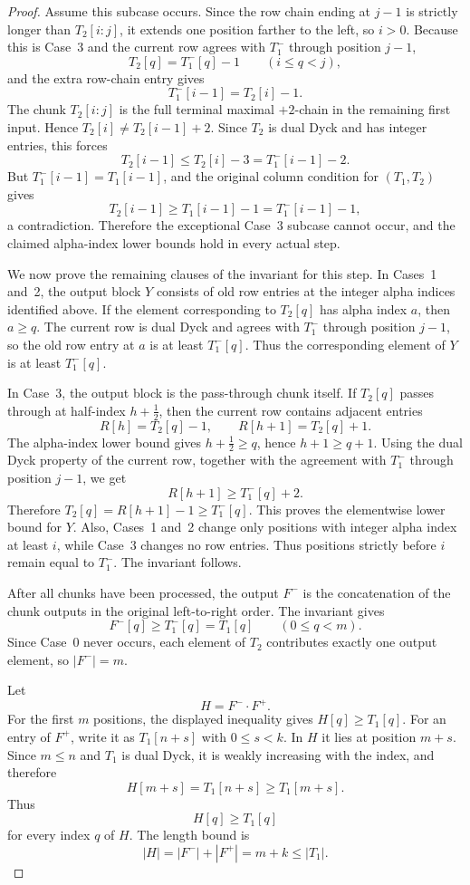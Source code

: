 \documentclass[11pt]{article}
\theoremstyle{plain}
\theoremstyle{definition}
\theoremstyle{remark}
\begin{document}
\begin{proof}
Assume this subcase occurs.  Since the row chain ending at
\(j-1\) is strictly longer than \(T_2[i:j]\), it extends one position farther to
the left, so \(i>0\).  Because this is Case~3 and the current row agrees with
\(T_1^-\) through position \(j-1\),
\[
  T_2[q]=T_1^-[q]-1
  \qquad (i\le q<j),
\]
and the extra row-chain entry gives
\[
  T_1^-[i-1]=T_2[i]-1.
\]
The chunk \(T_2[i:j]\) is the full terminal maximal \(+2\)-chain in the
remaining first input.  Hence \(T_2[i]\ne T_2[i-1]+2\).  Since \(T_2\) is dual
Dyck and has integer entries, this forces
\[
  T_2[i-1]\le T_2[i]-3=T_1^-[i-1]-2.
\]
But \(T_1^-[i-1]=T_1[i-1]\), and the original column condition for
\((T_1,T_2)\) gives
\[
  T_2[i-1]\ge T_1[i-1]-1=T_1^-[i-1]-1,
\]
a contradiction.  Therefore the exceptional Case~3 subcase cannot occur, and
the claimed alpha-index lower bounds hold in every actual step.

We now prove the remaining clauses of the invariant for this step.  In
Cases~1 and~2, the output block \(Y\) consists
of old row entries at the integer alpha indices identified above.  If the element
corresponding to \(T_2[q]\) has alpha index \(a\), then \(a\ge q\).  The current
row is dual Dyck and agrees with \(T_1^-\) through position \(j-1\), so the old
row entry at \(a\) is at least \(T_1^-[q]\).  Thus the corresponding element of
\(Y\) is at least \(T_1^-[q]\).

In Case~3, the output block is the pass-through chunk itself.  If \(T_2[q]\)
passes through at half-index \(h+\frac12\), then the current row contains
adjacent entries
\[
  R[h]=T_2[q]-1,
  \qquad
  R[h+1]=T_2[q]+1.
\]
The alpha-index lower bound gives \(h+\frac12\ge q\), hence \(h+1\ge q+1\).
Using the dual Dyck property of the current row, together with the agreement
with \(T_1^-\) through position \(j-1\), we get
\[
  R[h+1]\ge T_1^-[q]+2.
\]
Therefore \(T_2[q]=R[h+1]-1\ge T_1^-[q]\).  This proves the elementwise lower
bound for \(Y\).  Also, Cases~1 and~2 change only positions with integer alpha
index at least \(i\), while Case~3 changes no row entries.  Thus positions
strictly before \(i\) remain equal to \(T_1^-\).  The invariant follows.

After all chunks have been processed, the output \(F^-\) is the concatenation of
the chunk outputs in the original left-to-right order.  The invariant gives
\[
  F^-[q]\ge T_1^-[q]=T_1[q]
  \qquad (0\le q<m).
\]
Since Case~0 never occurs, each element of \(T_2\) contributes exactly one
output element, so \(|F^-|=m\).

Let
\[
  H=F^-\cdot F^+.
\]
For the first \(m\) positions, the displayed inequality gives \(H[q]\ge T_1[q]\).
For an entry of \(F^+\), write it as \(T_1[n+s]\) with \(0\le s<k\).  In \(H\)
it lies at position \(m+s\).  Since \(m\le n\) and \(T_1\) is dual Dyck, it is
weakly increasing with the index, and therefore
\[
  H[m+s]=T_1[n+s]\ge T_1[m+s].
\]
Thus
\[
  H[q]\ge T_1[q]
\]
for every index \(q\) of \(H\).  The length bound is
\[
  |H|=|F^-|+|F^+|=m+k\le |T_1|.
\]


\end{proof}
\end{document}
